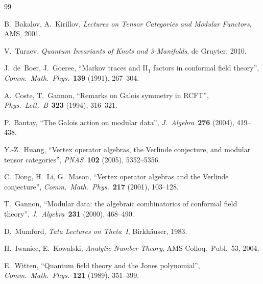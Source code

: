 \documentclass[12pt,a4paper]{article}
\theoremstyle{definition}
\theoremstyle{remark}
\begin{document}

\begin{thebibliography}{99}

B.~Bakalov, A.~Kirillov,
\textit{Lectures on Tensor Categories and Modular Functors},
AMS, 2001.

V.~Turaev,
\textit{Quantum Invariants of Knots and 3-Manifolds},
de Gruyter, 2010.

J.~de~Boer, J.~Goeree,
``Markov traces and II$_1$ factors in conformal field theory'',
\textit{Comm.\ Math.\ Phys.}\ \textbf{139} (1991), 267--304.

A.~Coste, T.~Gannon,
``Remarks on Galois symmetry in RCFT'',
\textit{Phys.\ Lett.\ B}\ \textbf{323} (1994), 316--321.

P.~Bantay,
``The Galois action on modular data'',
\textit{J.\ Algebra}\ \textbf{276} (2004), 419--438.

Y.-Z.~Huang,
``Vertex operator algebras, the Verlinde conjecture, and modular tensor categories'',
\textit{PNAS}\ \textbf{102} (2005), 5352--5356.

C.~Dong, H.~Li, G.~Mason,
``Vertex operator algebras and the Verlinde conjecture'',
\textit{Comm.\ Math.\ Phys.}\ \textbf{217} (2001), 103--128.

T.~Gannon,
``Modular data: the algebraic combinatorics of conformal field theory'',
\textit{J.\ Algebra}\ \textbf{231} (2000), 468--490.

D.~Mumford,
\textit{Tata Lectures on Theta~I},
Birkh\"auser, 1983.

H.~Iwaniec, E.~Kowalski,
\textit{Analytic Number Theory},
AMS Colloq.\ Publ.\ 53, 2004.

E.~Witten,
``Quantum field theory and the Jones polynomial'',
\textit{Comm.\ Math.\ Phys.}\ \textbf{121} (1989), 351--399.

\end{thebibliography}
\end{document}
